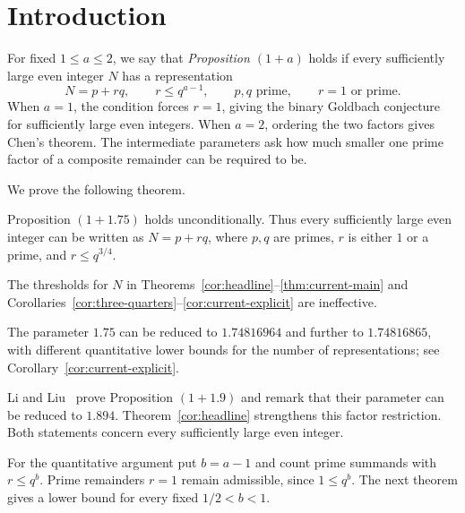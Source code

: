 \section{Introduction}
\label{sec:current-statement}

For fixed $1\le a\le2$, we say that \emph{Proposition $(1+a)$} holds
if every sufficiently large even integer $N$ has a representation
\[
 N=p+rq,\qquad r\le q^{a-1},\qquad
 p,q\text{ prime},\qquad r=1\text{ or prime}.
\]
When $a=1$, the condition forces $r=1$, giving the binary Goldbach
conjecture for sufficiently large even integers. When $a=2$, ordering
the two factors gives Chen's theorem. The intermediate parameters ask
how much smaller one prime factor of a composite remainder can be
required to be.

We prove the following theorem.

\begin{theorem}
\label{cor:headline}
Proposition $(1+1.75)$ holds unconditionally. Thus every sufficiently
large even integer can be written as $N=p+rq$, where $p,q$ are primes,
$r$ is either $1$ or a prime, and $r\le q^{3/4}$.
\end{theorem}

The thresholds for $N$ in Theorems~\ref{cor:headline}--\ref{thm:current-main}
and Corollaries~\ref{cor:three-quarters}--\ref{cor:current-explicit} are ineffective.

The parameter $1.75$ can be reduced to $1.74816964$ and further to $1.74816865$,
with different quantitative lower bounds for the number of
representations; see Corollary~\ref{cor:current-explicit}.

Li and Liu~\cite[Theorem~1.1]{LiLiu} prove Proposition $(1+1.9)$
and remark that their parameter can be reduced to $1.894$.
Theorem~\ref{cor:headline} strengthens this factor restriction.
Both statements concern every sufficiently large even integer.

For the quantitative argument put $b=a-1$ and count prime summands
with $r\le q^b$. Prime remainders $r=1$ remain admissible, since
$1\le q^b$. The next theorem gives a lower bound for every fixed
$1/2<b<1$.

